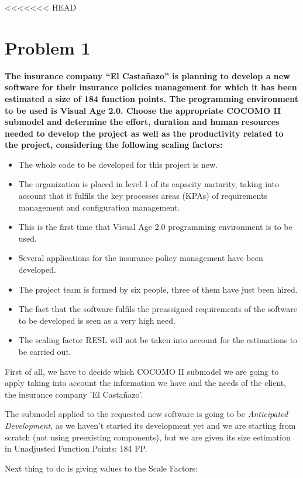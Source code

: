 <<<<<<< HEAD
\section{Problem 1}

\textbf{The insurance company “El Casta\~nazo” is planning to develop a new software for their insurance policies management for which it has been estimated a size of 184 function points.
The programming environment to be used is Visual Age 2.0. Choose the appropriate COCOMO II submodel and determine the effort, duration and human resources needed to develop the project as well as the productivity related to the project, considering the following scaling factors:}

\begin{itemize}
\item The whole code to be developed for this project is new.
\item The organization is placed in level 1 of its capacity maturity, taking into account that it fulfils the key processes areas (KPAs) of requirements
management and configuration management.
\item This is the first time that Visual Age 2.0 programming environment is to be used.
\item Several applications for the insurance policy management have been developed.
\item The project team is formed by six people, three of them have just been hired.
\item The fact that the software fulfils the preassigned requirements of the software to be developed is seen as a very high need.
\item The scaling factor RESL will not be taken into account for the estimations to be carried out.
\end{itemize}


\seprule

First of all, we have to decide which COCOMO II submodel we are going to apply taking into account the information we have and the needs of the client, the insurance company 'El Casta\~nazo'.

The submodel applied to the requested new software is going to be \emph{Anticipated Development}, as we haven't started its development yet and we are starting from scratch (not using preexisting components), but we are given its size estimation in Unadjusted Function Points: 184 FP.

Next thing to do is giving values to the Scale Factors:

